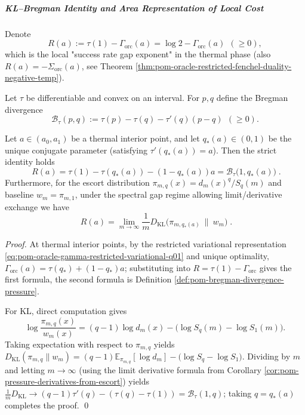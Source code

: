 \subparagraph{KL--Bregman Identity and Area Representation of Local Cost}
Denote
\[
R(a):=\tau(1)-\Gamma_{\mathrm{orc}}(a)=\log 2-\Gamma_{\mathrm{orc}}(a)\ \ (\ge 0),
\]
which is the local "success rate gap exponent" in the thermal phase (also \(R(a)=-\Sigma_{\mathrm{orc}}(a)\), see Theorem \ref{thm:pom-oracle-restricted-fenchel-duality-negative-temp}).

\begin{definition}\label{def:pom-bregman-divergence-pressure}
Let \(\tau\) be differentiable and convex on an interval.
For \(p,q\) define the Bregman divergence
\[
\mathcal{B}_{\tau}(p,q):=\tau(p)-\tau(q)-\tau'(q)(p-q)\ \ (\ge 0).
\]
\end{definition}

\begin{theorem}\label{thm:pom-oracle-local-cost-kl-bregman}
Let \(a\in(a_0,a_1)\) be a thermal interior point, and let \(q_*(a)\in(0,1)\) be the unique conjugate parameter (satisfying \(\tau'(q_*(a))=a\)).
Then the strict identity holds
\[
\boxed{\;
R(a)=\tau(1)-\tau(q_*(a))-(1-q_*(a))a
=\mathcal{B}_{\tau}\bigl(1,q_*(a)\bigr)\; } .
\]
Furthermore, for the escort distribution \(\pi_{m,q}(x)=d_m(x)^q/S_q(m)\) and baseline \(w_m=\pi_{m,1}\), under the spectral gap regime allowing limit/derivative exchange we have
\[
\boxed{\;
R(a)=\lim_{m\to\infty}\frac{1}{m}D_{\mathrm{KL}}\!\bigl(\pi_{m,q_*(a)}\ \|\ w_m\bigr)\; } .
\]
\end{theorem}
\begin{proof}
At thermal interior points, by the restricted variational representation \eqref{eq:pom-oracle-gamma-restricted-variational-q01} and unique optimality,
\(
\Gamma_{\mathrm{orc}}(a)=\tau(q_*)+(1-q_*)a
\);
substituting into \(R=\tau(1)-\Gamma_{\mathrm{orc}}\) gives the first formula, the second formula is Definition \ref{def:pom-bregman-divergence-pressure}.
\par
For KL, direct computation gives
\[
\log\frac{\pi_{m,q}(x)}{w_m(x)}
=(q-1)\log d_m(x)-\bigl(\log S_q(m)-\log S_1(m)\bigr).
\]
Taking expectation with respect to \(\pi_{m,q}\) yields
\(
D_{\mathrm{KL}}(\pi_{m,q}\|w_m)=(q-1)\mathbb{E}_{\pi_{m,q}}[\log d_m]-\bigl(\log S_q-\log S_1\bigr)
\).
Dividing by \(m\) and letting \(m\to\infty\) (using the limit derivative formula from Corollary \ref{cor:pom-pressure-derivatives-from-escort}) yields
\(
\frac{1}{m}D_{\mathrm{KL}}\to (q-1)\tau'(q)-(\tau(q)-\tau(1))
=\mathcal{B}_{\tau}(1,q)
\);
taking \(q=q_*(a)\) completes the proof. \qed
\end{proof}


